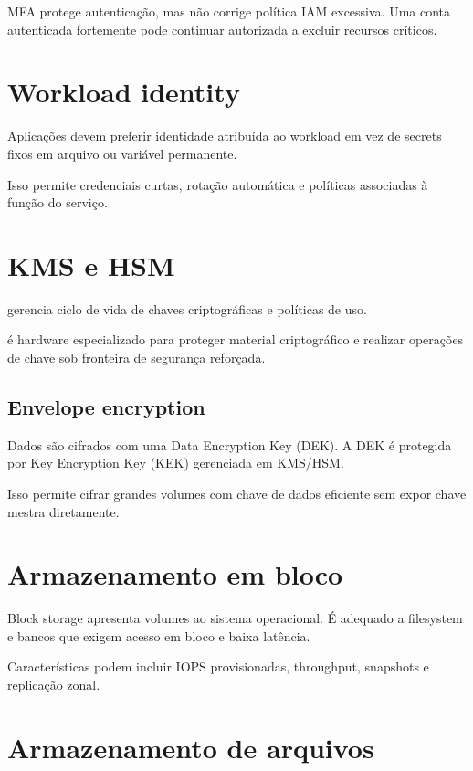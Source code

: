 \begin{atencao}
MFA protege autenticação, mas não corrige política IAM excessiva. Uma conta autenticada fortemente pode continuar autorizada a excluir recursos críticos.
\end{atencao}

\section{Workload identity}

Aplicações devem preferir identidade atribuída ao workload em vez de secrets fixos em arquivo ou variável permanente.

Isso permite credenciais curtas, rotação automática e políticas associadas à função do serviço.

\section{KMS e HSM}

 gerencia ciclo de vida de chaves criptográficas e políticas de uso.

 é hardware especializado para proteger material criptográfico e realizar operações de chave sob fronteira de segurança reforçada.

\subsection{Envelope encryption}

Dados são cifrados com uma Data Encryption Key (DEK). A DEK é protegida por Key Encryption Key (KEK) gerenciada em KMS/HSM.

Isso permite cifrar grandes volumes com chave de dados eficiente sem expor chave mestra diretamente.

\section{Armazenamento em bloco}

Block storage apresenta volumes ao sistema operacional. É adequado a filesystem e bancos que exigem acesso em bloco e baixa latência.

Características podem incluir IOPS provisionadas, throughput, snapshots e replicação zonal.

\section{Armazenamento de arquivos}


